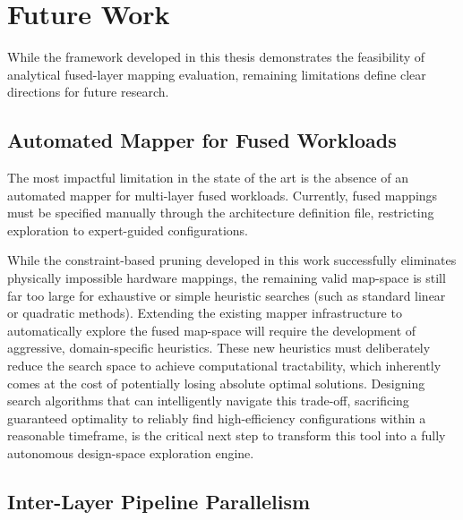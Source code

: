 \section{Future Work}
\label{sec:concl-future}

While the framework developed in this thesis demonstrates the feasibility of analytical fused-layer mapping evaluation, remaining limitations define clear directions for future research.

\subsection{Automated Mapper for Fused Workloads}
\label{sec:fw-mapper}

The most impactful limitation in the state of the art is the absence of an automated mapper for multi-layer fused workloads. Currently, fused mappings must be specified manually through the architecture definition file, restricting exploration to expert-guided configurations. 

While the constraint-based pruning developed in this work successfully eliminates physically impossible hardware mappings, the remaining valid map-space is still far too large for exhaustive or simple heuristic searches (such as standard linear or quadratic methods). Extending the existing mapper infrastructure to automatically explore the fused map-space will require the development of aggressive, domain-specific heuristics. These new heuristics must deliberately reduce the search space to achieve computational tractability, which inherently comes at the cost of potentially losing absolute optimal solutions. Designing search algorithms that can intelligently navigate this trade-off, sacrificing guaranteed optimality to reliably find high-efficiency configurations within a reasonable timeframe, is the critical next step to transform this tool into a fully autonomous design-space exploration engine.
\subsection{Inter-Layer Pipeline Parallelism}
\label{sec:fw-inter-layer}

